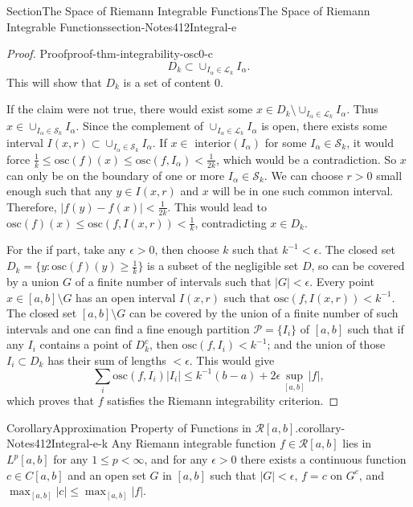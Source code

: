 \documentclass[oneside,10pt,]{article}
\numberwithin{equation}{section}
\newcommand{\cL}{\mathcal{L}}
\newcommand{\cP}{\mathcal{P}}
\newcommand{\cR}{\mathcal{R}}
\newcommand{\cS}{\mathcal{S}}
\newcommand{\osc}{\text{osc}}
\begin{document}
\begin{sectionptx}{Section}{The Space of Riemann Integrable Functions}{}{The Space of Riemann Integrable Functions}{}{}{section-Notes412Integral-e}
\begin{proof}{Proof}{}{proof-thm-integrability-osc0-c}
\begin{equation*}
D_{k}\subset \cup_{I_{\alpha}\in \cL_{k} } I_{\alpha}.
\end{equation*}
This will show that \(D_{k}\) is a set of content \(0\).%
\par
If the claim were not true, there would exist some \(x \in D_{k}
\setminus \cup_{I_{\alpha}\in \cL_{k} } I_{\alpha}\). Thus \(x \in \cup_{I_{\alpha}\in \cS_{k} } I_{\alpha}\). Since the complement of \(\cup_{I_{\alpha}\in \cL_{k} } I_{\alpha}\) is open, there exists some interval \(I(x, r)
\subset \cup_{I_{\alpha}\in \cS_{k} } I_{\alpha}\). If \(x\in \text{ interior}(I_{\alpha})\) for some \(I_{\alpha} \in \cS_{k}\), it would force \(\frac 1k \le \osc(f)(x)\le \osc(f, I_{\alpha}) < \frac{1}{2k}\), which would be a contradiction. So \(x\) can only be on the boundary of one or more \(I_{\alpha} \in \cS_{k}\). We can choose \(r>0\) small enough such that any \(y\in I(x, r)\) and \(x\) will be in one such common interval. Therefore, \(\vert f(y)-f(x)\vert < \frac{1}{2k}\). This would lead to \(\osc(f)(x)\le \osc(f, I(x, r)) < \frac 1k\), contradicting \(x \in D_{k}\).%
\par
For the if part, take any \(\epsilon > 0\), then choose \(k\) such that \(k^{-1} < \epsilon\). The closed set \(D_{k}=\{y: \osc(f)(y)\ge \frac 1k\}\) is a subset of the negligible set \(D\), so can be covered by a union \(G\) of a finite number of intervals such that \(|G| < \epsilon\). Every point \(x\in [a, b]\setminus G\) has an open interval \(I(x, r)\) such that \(\osc(f, I(x, r)) < k^{-1}\). The closed set \([a, b]\setminus G\) can be covered by the union of a finite number of such intervals and one can find a fine enough partition \(\cP=\{I_{i}\}\) of \([a, b]\) such that if any \(I_{i}\) contains a point of \(D_{k}^{c}\), then \(\osc(f, I_{i})< k^{-1}\); and the union of those \(I_{i}\subset D_{k} \) has their sum of lengths \(< \epsilon\). This would give%
\begin{equation*}
\sum_{i} \osc(f, I_{i})|I_{i}| \le k^{-1}(b-a) + 2\epsilon \sup_{[a, b]}|f| ,
\end{equation*}
which proves that \(f\)  satisfies the Riemann integrability criterion.%
\end{proof}
\begin{corollary}{Corollary}{Approximation Property of Functions in \(\cR[a, b]\).}{}{corollary-Notes412Integral-e-k}%
Any Riemann integrable function \(f\in \cR[a, b]\) lies in \(L^{p}[a, b]\) for any \(1\le p < \infty\), and for any \(\epsilon > 0\) there exists a continuous function \(c\in C[a, b]\) and an open set \(G\) in \([a, b]\) such that \(|G| < \epsilon\), \(f=c\) on \(G^{c}\), and \(\max_{[a, b]}|c| \le \max_{[a,b]}|f|\).\end{corollary}

\end{sectionptx}
\end{document}
